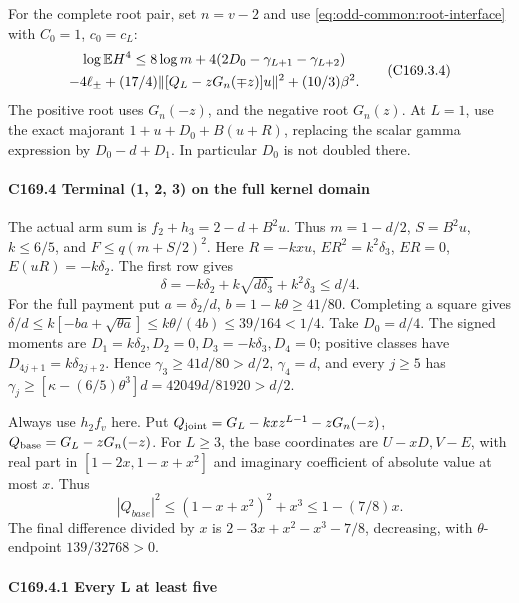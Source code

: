 For the complete root pair, set \(n=v-2\) and use
\eqref{eq:odd-common:root-interface} with \(C_0=1\), \(c_0=c_L\):
\[
 \begin{gathered}
 \log\mathbb E H^4\le8\log m+4(2D_0-\gamma_{L+1}-\gamma_{L+2})\\
 -4\ell_\pm+(17/4)\|[Q_L-zG_n(\mp z)]u\|^2
 +(10/3)\beta^2.
 \end{gathered}\tag{C169.3.4}
\]
The positive root uses \(G_n(-z)\), and the negative root \(G_n(z)\).
At \(L=1\), use the exact majorant
\(1+u+D_0+B(u+R)\), replacing the scalar gamma expression by
\(D_0-d+D_1\). In particular \(D_0\) is not doubled there.

\paragraph{C169.4 Terminal (1, 2, 3) on the full kernel domain}\label{part:C169.4}

The actual arm sum is \(f_2+h_3=2-d+B^2u\). Thus \(m=1-d/2\), \(S=B^2u\), \(k\le6/5\), and \(F\le q(m+S/2)^2\). Here \(R=-kxu\), \(ER^2=k^2\delta_3\), \(ER=0\), \(E(uR)=-k\delta_2\). The first row gives
\[
\delta=-k\delta_2+k\sqrt{d\delta_3}+k^2\delta_3\le d/4.                 \tag{C169.4.1}
\]
For the full payment put \(a=\delta_2/d\), \(b=1-k\theta\ge41/80\). Completing a square gives \(\delta/d\le k[-ba+\sqrt{\theta a}]\le k\theta/(4b)\le39/164<1/4\). Take \(D_0=d/4\). The signed moments are \(D_1=k\delta_2,\allowbreak \allowbreak  D_2=0,\allowbreak \allowbreak  D_3=-k\delta_3,\allowbreak \allowbreak  D_4=0\); positive classes have \(D_{4j+1}=k\delta_{2j+2}\). Hence \(\gamma_3\ge41d/80>d/2\), \(\gamma_4=d\), and every \(j\ge5\) has \(\gamma_j\ge[\kappa-(6/5)\theta^3]d=42049d/81920>d/2\).

Always use \(h_2f_v\) here. Put \(Q_{\rm joint}=G_L-kxz^{L-1}-zG_n(-z)\), \(Q_{\rm base}=G_L-zG_n(-z)\). For \(L\ge3\), the base coordinates are \(U-xD,\allowbreak \allowbreak  V-E\), with real part in \([1-2x,\allowbreak \allowbreak  1-x+x^2]\) and imaginary coefficient of absolute value at most \(x\). Thus
\[
|Q_{base}|^2\le(1-x+x^2)^2+x^3\le1-(7/8)x.                \tag{C169.4.2}
\]
The final difference divided by \(x\) is \(2-3x+x^2-x^3-7/8\), decreasing, with \(\theta\)-endpoint \(139/32768>0\).

\paragraph{C169.4.1 Every L at least five}

